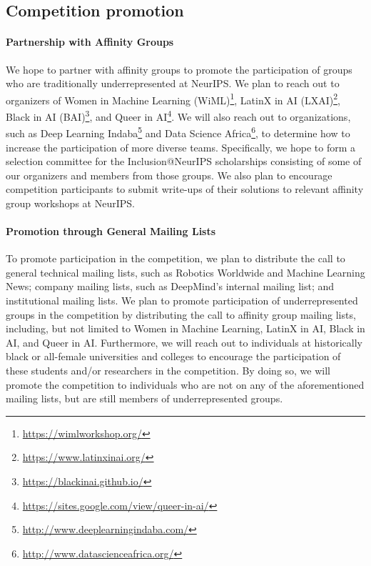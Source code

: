 \subsection{Competition promotion}

\paragraph{Partnership with Affinity Groups}
We hope to partner with affinity groups to promote the participation of groups who are traditionally underrepresented at NeurIPS.
We plan to reach out to organizers of Women in Machine Learning (WiML)\footnote{\url{https://wimlworkshop.org/}}, LatinX in AI (LXAI)\footnote{\url{https://www.latinxinai.org/}}, Black in AI (BAI)\footnote{\url{https://blackinai.github.io/}}, and Queer in AI\footnote{\url{https://sites.google.com/view/queer-in-ai/}}. 
We will also reach out to organizations, such as Deep Learning Indaba\footnote{\url{http://www.deeplearningindaba.com/}} and Data Science Africa\footnote{\url{http://www.datascienceafrica.org/}}, to determine how to increase the participation of more diverse teams.
Specifically, we hope to form a selection committee for the Inclusion@NeurIPS scholarships consisting of some of our organizers and members from those groups.
We also plan to encourage competition participants to submit write-ups of their solutions to relevant affinity group workshops at NeurIPS.

\paragraph{Promotion through General Mailing Lists}
To promote participation in the competition, we plan to distribute the call to general technical mailing lists, such as Robotics Worldwide and Machine Learning News; company mailing lists, such as DeepMind's internal mailing list; and institutional mailing lists. 
We plan to promote participation of underrepresented groups in the competition by distributing the call to affinity group mailing lists, including, but not limited to Women in Machine Learning, LatinX in AI, Black in AI, and Queer in AI.
Furthermore, we will reach out to individuals at historically black or all-female universities and colleges to encourage the participation of these students and/or researchers in the competition.
By doing so, we will promote the competition to individuals who are not on any of the aforementioned mailing lists, but are still members of underrepresented groups. 

